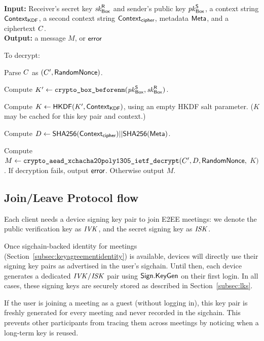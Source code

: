 
{\underline {\bf \cboxdecrypt}} \\
{\bf Input:} Receiver's secret key $\mathit{sk}_{{\sf Box}}^{\sf R}$ and sender's public key $\mathit{pk}_{{\sf Box}}^{\sf S}$, a context string
${\sf Context}_\textsf{KDF}$, a second context string ${\sf Context}_\textsf{cipher}$, metadata ${\sf Meta}$,
and a ciphertext $C$. \\
{\bf Output:} a message $M$, or ${\sf error}$

To decrypt:

\vspace{-1em}
\begingroup
\RaggedRight
\begin{enumerate*}
\item Parse $C$ as $(C', {\sf RandomNonce})$.
\item Compute $K' \leftarrow \texttt{crypto\_box\_beforenm}(\mathit{pk}_{{\sf Box}}^{\sf S}, \mathit{sk}_{{\sf Box}}^{\sf R})$.
\item Compute $K \leftarrow {\sf HKDF}(K', {\sf Context}_\textsf{KDF})$, using an empty HKDF salt parameter.
($K$ may be cached for this key pair and context.)
\item Compute $D \leftarrow {\sf SHA256}({\sf Context}_\textsf{cipher}) || {\sf SHA256}({\sf Meta})$.
\item Compute $M \leftarrow \texttt{crypto\_aead\_xchacha20poly1305\_ietf\_decrypt}(C', D,
{\sf RandomNonce},$ $K)$. If decryption fails, output ${\sf error}$. Otherwise output $M$.
\end{enumerate*}
\endgroup

\subsection{Join/Leave Protocol flow}\label{subsec:joinleave}

Each client needs a device signing key pair to join E2EE meetings: we denote the public verification
key as $\mathit{IVK}$, and the secret signing key as $\mathit{ISK}$.

Once sigchain-backed identity for meetings (Section~\ref{subsec:keyagreementidentity}) is available,
devices will directly use their signing key pairs as advertised in the user's sigchain.  Until then,
each device generates a dedicated $\mathit{IVK}/\mathit{ISK}$ pair using ${\sf Sign}.\mathsf{KeyGen}$ on their first login. In
all cases, these signing keys are securely stored as described in Section~\ref{subsec:lks}.

If the user is joining a meeting as a guest (without logging in), this key pair
is freshly generated for every meeting and never recorded in the sigchain. This
prevents other participants from tracing them
across meetings by noticing when a long-term key is reused.

